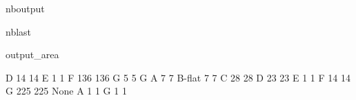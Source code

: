 \documentclass[letterpaper,10pt,english]{sphinxmanual}
\begin{document}
\begin{sphinxuseclass}{nboutput}
\begin{sphinxuseclass}{nblast}
{\begin{sphinxuseclass}{output_area}
\begin{sphinxuseclass}{}
\begin{sphinxVerbatim}[commandchars=\\\{\}]
                   D                               14                  14
                   E                                1                   1
                   F                              136                 136
                   G                                5                   5
G                  A                                7                   7
                   B-flat                           7                   7
                   C                               28                  28
                   D                               23                  23
                   E                                1                   1
                   F                               14                  14
                   G                              225                 225
None               A                                1                   1
                   G                                1                   1


\end{sphinxVerbatim}
\end{sphinxuseclass}
\end{sphinxuseclass}}
\end{sphinxuseclass}
\end{sphinxuseclass}
\end{document}
